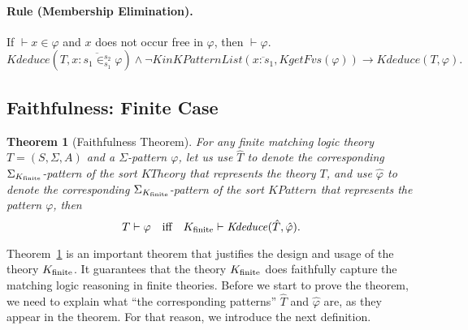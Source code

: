 \documentclass[UTF8,11pt]{article}
\newcounter{thmcounter}
\theoremstyle{plain}
\newtheorem{theorem}    [thmcounter]{Theorem}
\theoremstyle{definition}
\theoremstyle{remark}
\newcommand{\cln}{{:}}
\newcommand{\KinKPatternList}{\mathit{KinKPatternList}}
\newcommand{\KPattern}{\mathit{KPattern}}
\newcommand{\KgetFvs}{\mathit{KgetFvs}}
\newcommand{\KTheory}{\mathit{KTheory}}
\newcommand{\Kdeduce}{\mathit{Kdeduce}}
\begin{document}
\paragraph{Rule (Membership Elimination).}
If $\vdash x \in \varphi$ and $x$ does not occur free in $\varphi$, then $\vdash \varphi$.
\begin{equation*}
\Kdeduce(T, \overline{x \cln s_1 \in_{s_1}^{s_2} \varphi}) \wedge\neg \KinKPatternList(\overline{x \cln s_1}, \KgetFvs(\varphi)) \to \Kdeduce(T, \varphi).
\end{equation*}

\subsection{Faithfulness: Finite Case}

\begin{theorem}[Faithfulness Theorem]\label{thm:faithfulness-finite}
	For any finite matching logic theory $T = (S, \Sigma, A)$ and a $\Sigma$-pattern $\varphi$, let us use $\hat{T}$ to denote the corresponding $\Sigma_{K_\text{finite}}$-pattern of the sort $\KTheory$ that represents the theory $T$, and use $\hat{\varphi}$ to denote the corresponding $\Sigma_{K_\text{finite}}$-pattern of the sort $\KPattern$ that represents the pattern $\varphi$, then
	$$T \vdash \varphi \quad \text{iff} \quad \Kfinite \vdash \Kdeduce(\hat{T}, \hat{\varphi}).$$
\end{theorem}

Theorem~\ref{thm:faithfulness-finite} is an important theorem that justifies the design and usage of the theory ${K_\text{finite}}$. 
It guarantees that the theory ${K_\text{finite}}$ does faithfully capture the matching logic reasoning in finite theories.
Before we start to prove the theorem, we need to explain what ``the corresponding patterns'' $\hat{T}$ and $\hat{\varphi}$ are, as they appear in the theorem.
For that reason, we introduce the next definition.
\end{document}

